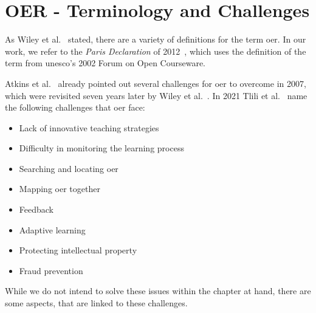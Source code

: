 \section{OER - Terminology and Challenges \label{sec:challenges}} %
As Wiley et al.~\cite{wiley:2014:oer} stated, there are a variety of definitions for the term \acrshort{oer}. In our work, we refer to the \emph{Paris Declaration} of 2012~\cite{declaration:2012:paris}, which uses the definition of the term from \acrshort{unesco}’s 2002 Forum on Open Courseware.

Atkins et al.~\cite{atkins:2007:review} already pointed out several challenges for \acrshort{oer} to overcome in 2007, which were revisited seven years later by Wiley et al.~\cite{wiley:2014:oer}. In 2021  Tlili et al.~\cite{tlili:2021:towards} name the following challenges that \acrshort{oer} face:
\begin{itemize}
	\setlength{\itemsep}{-0.3cm}
	\item Lack of innovative teaching strategies
	\item Difficulty in monitoring the learning process
	\item Searching and locating \acrshort{oer}
	\item Mapping \acrshort{oer} together
	\item Feedback
	\item Adaptive learning
	\item Protecting intellectual property
	\item Fraud prevention
\end{itemize}

While we do not intend to solve these issues within the chapter at hand, there are some aspects, that are linked to these challenges.

